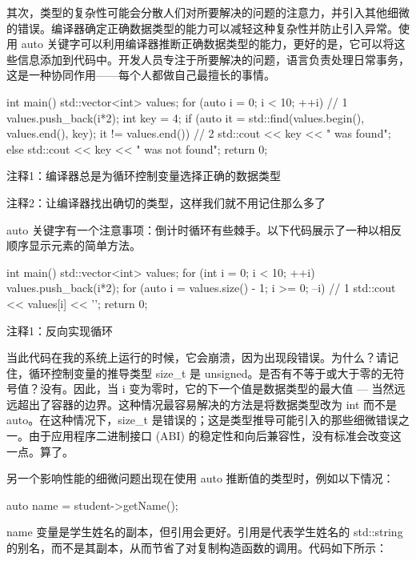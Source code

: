 其次，类型的复杂性可能会分散人们对所要解决的问题的注意力，并引入其他细微的错误。编译器确定正确数据类型的能力可以减轻这种复杂性并防止引入异常。使用 auto 关键字可以利用编译器推断正确数据类型的能力，更好的是，它可以将这些信息添加到代码中。开发人员专注于所要解决的问题，语言负责处理日常事务，这是一种协同作用——每个人都做自己最擅长的事情。


\begin{cpp}
int main() {
  std::vector<int> values;
  for (auto i = 0; i < 10; ++i) // 1
    values.push_back(i*2);
  int key = 4;
  if (auto it = std::find(values.begin(),
          values.end(), key); it != values.end()) // 2
    std::cout << key << " was found\n";
  else
    std::cout << key << " was not found\n";
  return 0;
}
\end{cpp}

{\footnotesize
注释1：编译器总是为循环控制变量选择正确的数据类型

注释2：让编译器找出确切的类型，这样我们就不用记住那么多了
}

auto 关键字有一个注意事项：倒计时循环有些棘手。以下代码展示了一种以相反顺序显示元素的简单方法。


\begin{cpp}
int main() {
  std::vector<int> values;
  for (int i = 0; i < 10; ++i)
    values.push_back(i*2);
  for (auto i = values.size() - 1; i >= 0; --i) // 1
    std::cout << values[i] << '\n';
  return 0;
}
\end{cpp}

{\footnotesize
注释1：反向实现循环
}

当此代码在我的系统上运行的时候，它会崩溃，因为出现段错误。为什么？请记住，循环控制变量的推导类型 size\_t 是 unsigned。是否有不等于或大于零的无符号值？没有。因此，当 i 变为零时，它的下一个值是数据类型的最大值 — 当然远远超出了容器的边界。这种情况最容易解决的方法是将数据类型改为 int 而不是 auto。在这种情况下，size\_t 是错误的；这是类型推导可能引入的那些细微错误之一。由于应用程序二进制接口 (ABI) 的稳定性和向后兼容性，没有标准会改变这一点。算了。

另一个影响性能的细微问题出现在使用 auto 推断值的类型时，例如以下情况：

\begin{cpp}
auto name = student->getName();
\end{cpp}

name 变量是学生姓名的副本，但引用会更好。引用是代表学生姓名的 std::string 的别名，而不是其副本，从而节省了对复制构造函数的调用。代码如下所示：

